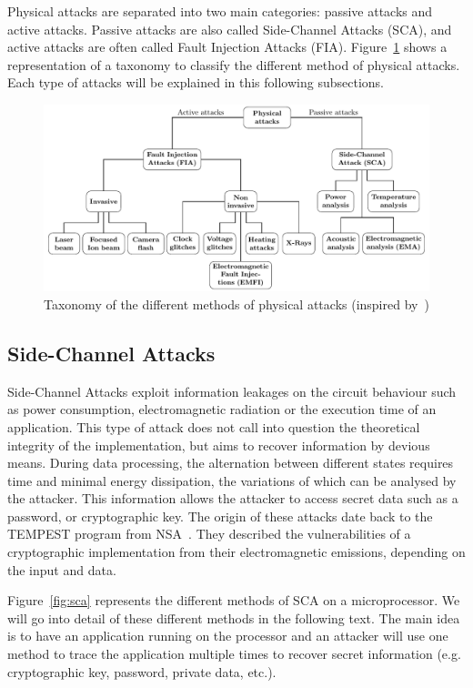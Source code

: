 Physical attacks are separated into two main categories: passive attacks and active attacks. Passive attacks are also called Side-Channel Attacks (SCA), and active attacks are often called Fault Injection Attacks (FIA). Figure~\ref{fig:arbo_fia} shows a representation of a taxonomy to classify the different method of physical attacks. Each type of attacks will be explained in this following subsections.

\begin{figure}[ht]
    \centering
    \includegraphics[width=\textwidth, page=1]{c2_soa/img/physicalAttacks.pdf}
    \caption{Taxonomy of the different methods of physical attacks (inspired by~\cite{CKNDCTD-21-compsec})}
    \label{fig:arbo_fia}
\end{figure}

\subsection{Side-Channel Attacks}
Side-Channel Attacks exploit information leakages on the circuit behaviour such as power consumption, electromagnetic radiation or the execution time of an application.
This type of attack does not call into question the theoretical integrity of the implementation, but aims to recover information by devious means. During data processing, the alternation between different states requires time and minimal energy dissipation, the variations of which can be analysed by the attacker.
This information allows the attacker to access secret data such as a password, or cryptographic key. The origin of these attacks date back to the \mbox{TEMPEST} program from NSA~\cite{F-72-nsa}. They described the vulnerabilities of a cryptographic implementation from their electromagnetic emissions, depending on the input and data.

Figure~\ref{fig:sca} represents the different methods of SCA on a microprocessor. We will go into detail of these different methods in the following text. The main idea is to have an application running on the processor and an attacker will use one method to trace the application multiple times to recover secret information (e.g. cryptographic key, password, private data, etc.).

